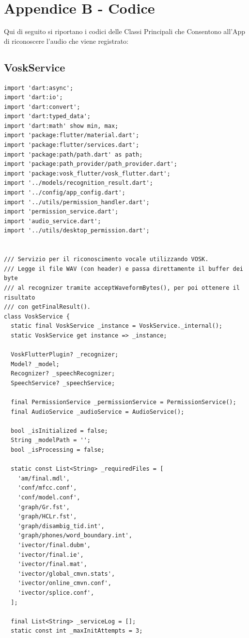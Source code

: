 \documentclass[14pt]{extbook}
\begin{document}
\pagebreak
\clearpage
\chapter{Appendice B - Codice}
Qui di seguito si riportano i codici delle Classi Principali che Consentono all'App di riconoscere l'audio che viene registrato:
\section{VoskService}
\begin{lstlisting}[caption=vosk\_service.dart, label=lst:VoskService]
import 'dart:async';
import 'dart:io';
import 'dart:convert';
import 'dart:typed_data';
import 'dart:math' show min, max;
import 'package:flutter/material.dart';
import 'package:flutter/services.dart';
import 'package:path/path.dart' as path;
import 'package:path_provider/path_provider.dart';
import 'package:vosk_flutter/vosk_flutter.dart';
import '../models/recognition_result.dart';
import '../config/app_config.dart';
import '../utils/permission_handler.dart';
import 'permission_service.dart';
import 'audio_service.dart';
import '../utils/desktop_permission.dart';


/// Servizio per il riconoscimento vocale utilizzando VOSK.
/// Legge il file WAV (con header) e passa direttamente il buffer dei byte
/// al recognizer tramite acceptWaveformBytes(), per poi ottenere il risultato
/// con getFinalResult().
class VoskService {
  static final VoskService _instance = VoskService._internal();
  static VoskService get instance => _instance;

  VoskFlutterPlugin? _recognizer;
  Model? _model;
  Recognizer? _speechRecognizer;
  SpeechService? _speechService;

  final PermissionService _permissionService = PermissionService();
  final AudioService _audioService = AudioService();

  bool _isInitialized = false;
  String _modelPath = '';
  bool _isProcessing = false;

  static const List<String> _requiredFiles = [
    'am/final.mdl',
    'conf/mfcc.conf',
    'conf/model.conf',
    'graph/Gr.fst',
    'graph/HCLr.fst',
    'graph/disambig_tid.int',
    'graph/phones/word_boundary.int',
    'ivector/final.dubm',
    'ivector/final.ie',
    'ivector/final.mat',
    'ivector/global_cmvn.stats',
    'ivector/online_cmvn.conf',
    'ivector/splice.conf',
  ];

  final List<String> _serviceLog = [];
  static const int _maxInitAttempts = 3;


\end{lstlisting}
\end{document}
